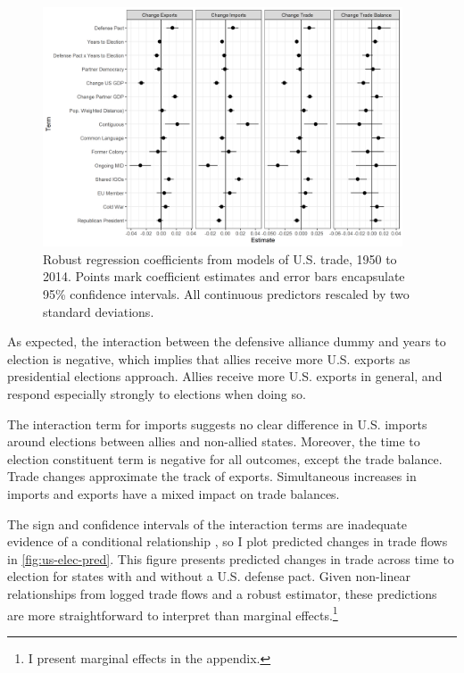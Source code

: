 \documentclass[12pt]{article}
\begin{document}
\begin{figure}
\centering
\includegraphics[width=0.95\textwidth]{../figures/us-trade-coefs.png}
\caption{Robust regression coefficients from models of U.S. trade, 1950 to 2014. Points mark coefficient estimates and error bars encapsulate 95\% confidence intervals. All continuous predictors rescaled by two standard deviations.}
\label{fig:us-trade-coefs}
\end{figure}


As expected, the interaction between the defensive alliance dummy and years to election is negative, which implies that allies receive more U.S. exports as presidential elections approach.
Allies receive more U.S. exports in general, and respond especially strongly to elections when doing so.


The interaction term for imports suggests no clear difference in U.S. imports around elections between allies and non-allied states. 
Moreover, the time to election constituent term is negative for all outcomes, except the trade balance. 
Trade changes approximate the track of exports. 
Simultaneous increases in imports and exports have a mixed impact on trade balances.
 


The sign and confidence intervals of the interaction terms are inadequate evidence of a conditional relationship \citep{BramborClarkGolder2006}, so I plot predicted changes in trade flows in \autoref{fig:us-elec-pred}.
This figure presents predicted changes in trade across time to election for states with and without a U.S. defense pact. 
Given non-linear relationships from logged trade flows and a robust estimator, these predictions are more straightforward to interpret than marginal effects.\footnote{I present marginal effects in the appendix.} 
\end{document}
